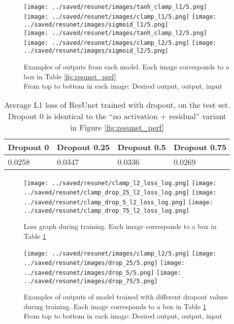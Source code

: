 \begin{figure}[H]
  \centering
  \captionsetup{justification=centering}
  \texttt{[image: ../saved/resunet/images/tanh\_clamp\_l1/5.png]}
  \texttt{[image: ../saved/resunet/images/clamp\_l1/5.png]}
  \texttt{[image: ../saved/resunet/images/sigmoid\_l1/5.png]}\\
  \texttt{[image: ../saved/resunet/images/tanh\_clamp\_l2/5.png]}
  \texttt{[image: ../saved/resunet/images/clamp\_l2/5.png]}
  \texttt{[image: ../saved/resunet/images/sigmoid\_l2/5.png]}
  \caption[center]{Examples of outputs from each model. Each image corresponds to a box in Table \ref{fig:resunet_perf}\\ From top to bottom in each image: Desired output, output, input}\label{image:resunet_images}
\end{figure}

\begin{table}[H]
  \centering
  \begin{tabular}{|l|l|l|l|}
    \hline
    Dropout 0 & Dropout 0.25 & Dropout 0.5 & Dropout 0.75\\ \hline
    0.0258 & 0.0347 & 0.0336 & 0.0269 \\ \hline
  \end{tabular}
  \caption{Average L1 loss of ResUnet trained with dropout, on the test set. Dropout 0 is identical to the ``no activation + residual'' variant in Figure \ref{fig:resunet_perf}}\label{fig:resunet_drop_perf}
\end{table}

\begin{figure}[H]
  \centering
  \captionsetup{justification=centering}
  \texttt{[image: ../saved/resunet/clamp\_l2\_loss\_log.png]}
  \texttt{[image: ../saved/resunet/clamp\_drop\_25\_l2\_loss\_log.png]}
  \texttt{[image: ../saved/resunet/clamp\_drop\_5\_l2\_loss\_log.png]}
  \texttt{[image: ../saved/resunet/clamp\_drop\_75\_l2\_loss\_log.png]}
  \caption[center]{Loss graph during training. Each image corresponds to a box in Table \ref{fig:resunet_drop_perf}}\label{image:resunet_drop_loss}
\end{figure}


\begin{figure}[H]
  \centering
  \captionsetup{justification=centering}
  \texttt{[image: ../saved/resunet/images/clamp\_l2/5.png]}
  \texttt{[image: ../saved/resunet/images/drop\_25/5.png]}
  \texttt{[image: ../saved/resunet/images/drop\_5/5.png]}
  \texttt{[image: ../saved/resunet/images/drop\_75/5.png]}
  \caption[center]{Examples of outputs of model trained with different dropout values during training. Each image corresponds to a box in Table \ref{fig:resunet_drop_perf}\\ From top to bottom in each image: Desired output, output, input}\label{image:resunet_drop_images}
\end{figure}

